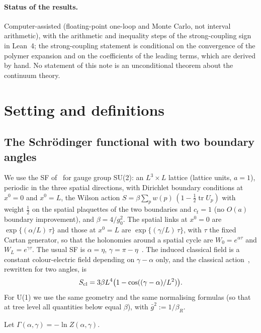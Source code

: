 \documentclass[11pt,a4paper]{article}
\theoremstyle{definition}
\theoremstyle{remark}
\newcommand{\gb}{\bar g^{2}}
\newcommand{\bR}{\beta_R}
\begin{document}
\paragraph{Status of the results.} Computer-assisted (floating-point one-loop and Monte Carlo, not interval arithmetic), with the arithmetic and inequality steps of the strong-coupling sign in Lean~4; the strong-coupling statement is conditional on the convergence of the polymer expansion and on the coefficients of the leading terms, which are derived by hand. No statement of this note is an unconditional theorem about the continuum theory.

\section{Setting and definitions}\label{sec:setting}

\subsection{The Schrödinger functional with two boundary angles}

We use the SF of~\cite{LNWW,LSWW} for gauge group SU(2): an $L^3\times L$ lattice (lattice units, $a=1$), periodic in the three spatial directions, with Dirichlet boundary conditions at $x^0=0$ and $x^0=L$, the Wilson action $S=\beta\sum_p w(p)\,(1-\tfrac12\operatorname{tr}U_p)$ with weight $\tfrac12$ on the spatial plaquettes of the two boundaries and $c_t=1$ (no $O(a)$ boundary improvement), and $\beta=4/g_0^2$. The spatial links at $x^0=0$ are $\exp\{(\alpha/L)\,\tau\}$ and those at $x^0=L$ are $\exp\{(\gamma/L)\,\tau\}$, with $\tau$ the fixed Cartan generator, so that the holonomies around a spatial cycle are $W_0=e^{\alpha\tau}$ and $W_L=e^{\gamma\tau}$. The usual SF is $\alpha=\eta$, $\gamma=\pi-\eta$~\cite[(2.5),(2.6)]{LSWW}. The induced classical field is a constant colour-electric field depending on $\gamma-\alpha$ only, and the classical action~\cite[(2.11)]{LSWW}, rewritten for two angles, is
\begin{equation}\label{eq:Scl}
S_{\rm cl}=3\beta L^4\bigl(1-\cos((\gamma-\alpha)/L^2)\bigr).
\end{equation}
For U(1) we use the same geometry and the same normalising formulas (so that at tree level all quantities below equal $\beta$), with $\gb:=1/\bR$.

Let $\Gamma(\alpha,\gamma)=-\ln Z(\alpha,\gamma)$.
\end{document}
